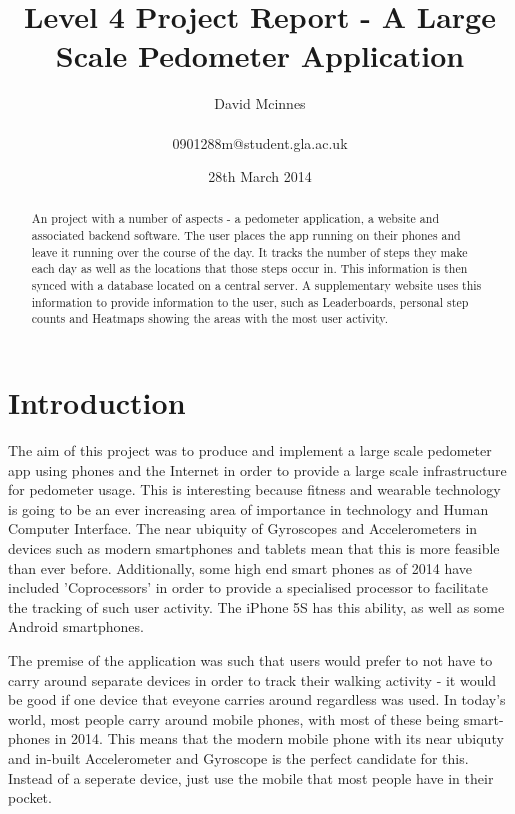 \documentclass{l4proj}
\begin{document}
\title{Level 4 Project Report - A Large Scale Pedometer Application}
\author{David Mcinnes\\ \\0901288m@student.gla.ac.uk}
\date{28th March 2014}
\maketitle

\begin{abstract}

An project with a number of aspects - a pedometer application, a website and associated backend software. The user places the app running on their phones and leave it running over the course of the day. It tracks the number of steps they make each day as well as the locations that those steps occur in. This information is then synced with a database located on a central server. A supplementary website uses this information to provide information to the user, such as Leaderboards, personal step counts and Heatmaps showing the areas with the most user activity.

\end{abstract}

\educationalconsent
\tableofcontents

\chapter{Introduction}

The aim of this project was to produce and implement a large scale pedometer app using phones and the Internet in order to provide a large scale infrastructure for pedometer usage. This is interesting because fitness and wearable technology is going to be an ever increasing area of importance in technology and Human Computer Interface. The near ubiquity of Gyroscopes and Accelerometers in devices such as modern smartphones and tablets mean that this is more feasible than ever before. Additionally, some high end smart phones as of 2014 have included 'Coprocessors' in order to provide a specialised processor to facilitate the tracking of such user activity. The iPhone 5S has this ability, as well as some Android smartphones. 

The premise of the application was such that users would prefer to not have to carry around separate devices in order to track their walking activity - it would be good if one device that eveyone carries around regardless was used. In today's world, most people carry around mobile phones, with most of these being smart-phones in 2014. This means that the modern mobile phone with its near ubiquty and in-built Accelerometer and Gyroscope is the perfect candidate for this. Instead of a seperate device, just use the mobile that most people have in their pocket.
\end{document}
